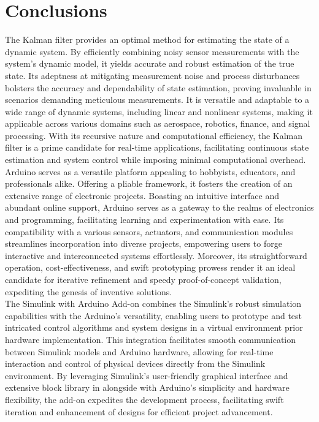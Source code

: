\section{Conclusions}
The Kalman filter provides an optimal method for estimating the state of a dynamic system. By efficiently combining noisy sensor measurements with the system's dynamic model, it yields accurate and robust estimation of the true state. Its adeptness at mitigating measurement noise and process disturbances bolsters the accuracy and dependability of state estimation, proving invaluable in scenarios demanding meticulous measurements. It is versatile and adaptable to a wide range of dynamic systems, including linear and nonlinear systems, making it applicable across various domains such as aerospace, robotics, finance, and signal processing. With its recursive nature and computational efficiency, the Kalman filter is a prime candidate for real-time applications, facilitating continuous state estimation and system control while imposing minimal computational overhead. \\

Arduino serves as a versatile platform appealing to hobbyists, educators, and professionals alike. Offering a pliable framework, it fosters the creation of an extensive range of electronic projects. Boasting an intuitive interface and abundant online support, Arduino serves as a gateway to the realms of electronics and programming, facilitating learning and experimentation with ease. Its compatibility with a various sensors, actuators, and communication modules streamlines incorporation into diverse projects, empowering users to forge interactive and interconnected systems effortlessly. Moreover, its straightforward operation, cost-effectiveness, and swift prototyping prowess render it an ideal candidate for iterative refinement and speedy proof-of-concept validation, expediting the genesis of inventive solutions. \\

The Simulink with Arduino Add-on combines the Simulink's robust simulation capabilities with the Arduino's versatility, enabling users to prototype and test intricated control algorithms and system designs in a virtual environment prior hardware implementation. This integration facilitates smooth communication between Simulink models and Arduino hardware, allowing for real-time interaction and control of physical devices directly from the Simulink environment. By leveraging Simulink's user-friendly graphical interface and extensive block library in alongside with Arduino's simplicity and hardware flexibility, the add-on expedites the development process, facilitating swift iteration and enhancement of designs for efficient project advancement.


